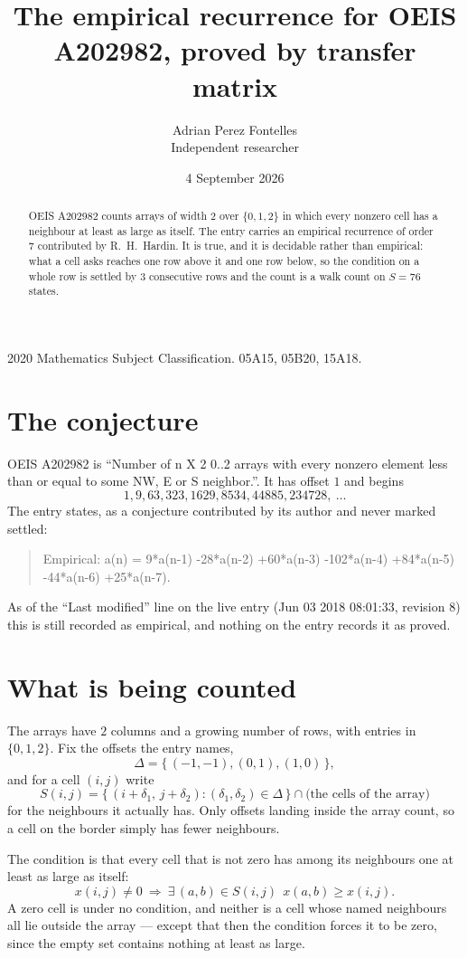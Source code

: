 \documentclass[11pt,a4paper]{article}
\title{The empirical recurrence for OEIS A202982, proved by transfer matrix}
\author{Adrian Perez Fontelles\\ \small Independent researcher}
\date{4 September 2026}
\theoremstyle{plain}
\theoremstyle{definition}
\begin{document}
\maketitle

\begin{abstract}
OEIS A202982 counts arrays of width $2$ over $\{0,1,2\}$ in which every nonzero cell has a neighbour at least as large as itself. The entry carries an
empirical recurrence of order $7$ contributed by R.~H.~Hardin. It is true, and it is
decidable rather than empirical: what a cell asks reaches one row above it and one row below, so the
condition on a whole row is settled by $3$ consecutive rows and the count is a walk
count on $S=76$ states.
\end{abstract}

\noindent\small 2020 Mathematics Subject Classification. 05A15, 05B20, 15A18.\normalsize

\section{The conjecture}

OEIS A202982 is ``Number of n X 2 0..2 arrays with every nonzero element less than or equal to some NW, E or S neighbor.''. It has offset $1$ and begins
\[
1, 9, 63, 323, 1629, 8534, 44885, 234728,\ \dots
\]
The entry states, as a conjecture contributed by its author and never marked settled:
\begin{quote}
Empirical: a(n) = 9*a(n-1) -28*a(n-2) +60*a(n-3) -102*a(n-4) +84*a(n-5) -44*a(n-6) +25*a(n-7).
\end{quote}
As of the ``Last modified'' line on the live entry (Jun 03 2018 08:01:33, revision 8) this is still
recorded as empirical, and nothing on the entry records it as proved.

\section{What is being counted}

The arrays have $2$ columns and a growing number of rows, with entries in $\{0,1,2\}$. Fix the
offsets the entry names,
\[
\Delta=\{\,(-1,-1), (0,1), (1,0)\,\},
\]
and for a cell $(i,j)$ write
\[
S(i,j)=\{\,(i+\delta_1,\,j+\delta_2) : (\delta_1,\delta_2)\in\Delta\,\}\cap
\text{(the cells of the array)}
\]
for the neighbours it actually has. Only offsets landing inside the array count, so a cell on
the border simply has fewer neighbours.

The condition is that every cell that is not zero has among its neighbours one at least as large as itself:
\[
x(i,j)\neq0\ \Longrightarrow\ \exists\,(a,b)\in S(i,j)\ \ x(a,b)\ge x(i,j).
\]
A zero cell is under no condition, and neither is a cell whose named neighbours all lie outside the array --- except that then the condition forces it to be zero, since the empty set contains nothing at least as large.
\end{document}
